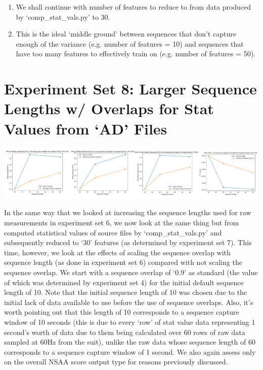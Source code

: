 \documentclass[12pt,twoside]{report}
\begin{document}
\begin{enumerate}
	\item We shall continue with number of features to reduce to from data produced by ‘comp\_stat\_vals.py’ to 30.
	\item This is the ideal ‘middle ground’ between sequences that don’t capture enough of the variance (e.g. number of features = 10) and sequences that have too many features to effectively train on (e.g. number of features = 50).
\end{enumerate}



\section{Experiment Set 8: Larger Sequence Lengths w/ Overlaps for Stat Values from ‘AD’ Files}

\begin{center}
\includegraphics[scale=0.35]{project_figures/fig10_15}
\end{center}

\quad In the same way that we looked at increasing the sequence lengths used for raw measurements in experiment set 6, we now look at the same thing but from computed statistical values of source files by ‘comp\_stat\_vals.py’ and subsequently reduced to ‘30’ features (as determined by experiment set 7). This time, however, we look at the effects of scaling the sequence overlap with sequence length (as done in experiment set 6) compared with not scaling the sequence overlap. We start with a sequence overlap of ‘0.9’ as standard (the value of which was determined by experiment set 4) for the initial default sequence length of 10. Note that the initial sequence length of 10 was chosen due to the initial lack of data available to use before the use of sequence overlaps. Also, it’s worth pointing out that this length of 10 corresponds to a sequence capture window of 10 seconds (this is due to every ‘row’ of stat value data representing 1 second’s worth of data due to them being calculated over 60 rows of raw data sampled at 60Hz from the suit), unlike the raw data whose sequence length of 60 corresponds to a sequence capture window of 1 second. We also again assess only on the overall NSAA score output type for reasons previously discussed.\\
\end{document}
